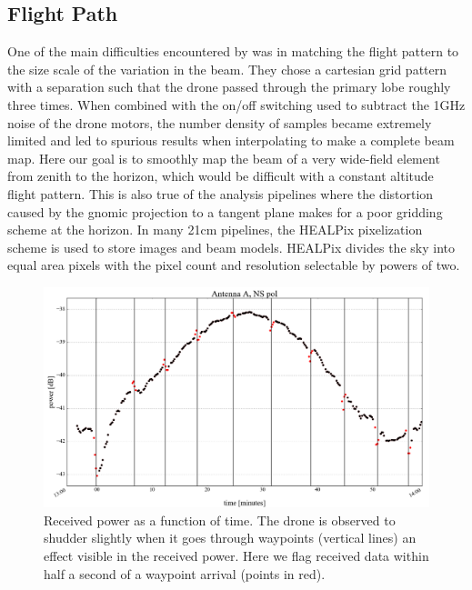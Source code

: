\documentclass[preprint2,numberedappendix,tighten,twocolappendix]{aastex6}
\begin{document}
\subsection{Flight Path}
One of the main difficulties encountered by \citet{2015PASP..127.1131C} was in matching the flight pattern to the size scale of the variation in the beam.  They chose a cartesian grid pattern with a separation such that the drone passed through the primary lobe roughly three times.  When combined with the on/off switching used to subtract the 1GHz noise of the drone motors, the number density of samples became extremely limited and led to spurious results when interpolating to make a complete beam map.  Here our goal is to smoothly map the beam of a very wide-field element from zenith to the horizon, which would be difficult with a constant altitude flight pattern.  This is also true of the analysis pipelines where the distortion caused by the gnomic projection to a tangent plane makes for a poor gridding scheme at the horizon. In many 21cm pipelines, the HEALPix pixelization scheme \citep{Gorski:2005p7667} is used to store images and beam models.  HEALPix divides the sky into equal area pixels with the pixel count and resolution selectable by powers of two.

\begin{figure}[htb]
\includegraphics[width=\columnwidth]{figures/GB_waypoint_flagging_zoom.png}
\caption{Received power as a function of time. The drone is observed to shudder slightly when it goes through waypoints (vertical lines) an effect visible in the received power. Here we flag received data within half a second of a waypoint arrival (points in red).}
\label{fig:waypoint_flagging}
\end{figure}
\end{document}
